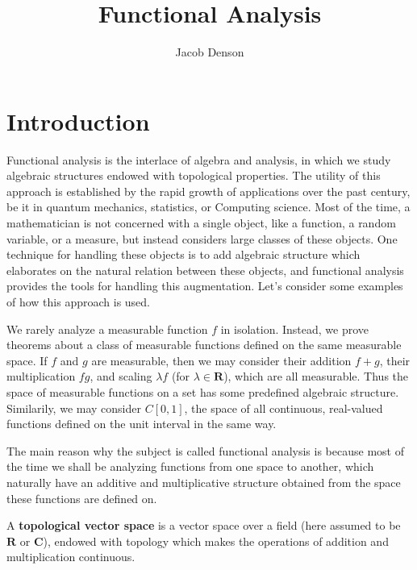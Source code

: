

\title{Functional Analysis}
\author{Jacob Denson}



\maketitle
\tableofcontents
{}

\chapter{Introduction}

Functional analysis is the interlace of algebra and analysis, in which we study algebraic structures endowed with topological properties. The utility of this approach is established by the rapid growth of applications over the past century, be it in quantum mechanics, statistics, or Computing science. Most of the time, a mathematician is not concerned with a single object, like a function, a random variable, or a measure, but instead considers large classes of these objects. One technique for handling these objects is to add algebraic structure which elaborates on the natural relation between these objects, and functional analysis provides the tools for handling this augmentation. Let's consider some examples of how this approach is used.

\begin{example}
    We rarely analyze a measurable function $f$ in isolation. Instead, we prove theorems about a class of measurable functions defined on the same measurable space. If $f$ and $g$ are measurable, then we may consider their addition $f + g$, their multiplication $fg$, and scaling $\lambda f$ (for $\lambda \in \mathbf{R}$), which are all measurable. Thus the space of measurable functions on a set has some predefined algebraic structure. Similarily, we may consider $C[0,1]$, the space of all continuous, real-valued functions defined on the unit interval in the same way.
\end{example}

The main reason why the subject is called functional analysis is because most of the time we shall be analyzing functions from one space to another, which naturally have an additive and multiplicative structure obtained from the space these functions are defined on.

\begin{definition}
    A {\bf topological vector space} is a vector space over a field (here assumed to be $\mathbf{R}$ or $\mathbf{C}$), endowed with  topology which makes the operations of addition and multiplication continuous.
\end{definition}

